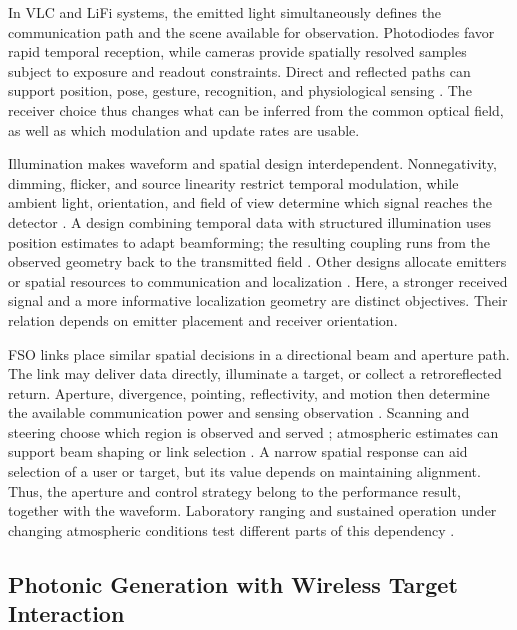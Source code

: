 In VLC and LiFi systems, the emitted light simultaneously defines the
communication path and the scene available for observation. Photodiodes favor
rapid temporal reception, while cameras provide spatially resolved samples
subject to exposure and readout constraints. Direct and reflected paths can
support position, pose, gesture, recognition, and physiological sensing
\cite{OISAC_SCR00910,OISAC_SCR01034,OISAC_SCR01036}. The receiver choice thus
changes what can be inferred from the common optical field, as well as which
modulation and update rates are usable.

Illumination makes waveform and spatial design interdependent. Nonnegativity,
dimming, flicker, and source linearity restrict temporal modulation, while
ambient light, orientation, and field of view determine which signal reaches
the detector \cite{OISAC_SCR00273,OISAC_SCR00925}. A design combining temporal
data with structured illumination uses position estimates to adapt beamforming;
the resulting coupling runs from the observed geometry back to the transmitted
field \cite{OISAC_SCR00196}. Other designs allocate emitters or spatial
resources to communication and localization
\cite{OISAC_SCR00901,OISAC_SCR00407,OISAC_SCR00557}. Here, a stronger received
signal and a more informative localization geometry are distinct objectives.
Their relation depends on emitter placement and receiver orientation.

FSO links place similar spatial decisions in a directional beam and aperture
path. The link may deliver data directly, illuminate a target, or collect a
retroreflected return. Aperture, divergence, pointing, reflectivity, and motion
then determine the available communication power and sensing observation
\cite{OISAC_SCR00011,OISAC_SCR01029,OISAC_SCR00730}. Scanning and steering
choose which region is observed and served
\cite{OISAC_SCR00012,OISAC_SCR00506,OISAC_SCR00941}; atmospheric estimates
can support beam shaping or link selection
\cite{OISAC_SCR01085,OISAC_SCR00456}. A narrow spatial response can aid
selection of a user or target, but its value depends on maintaining alignment.
Thus, the aperture and control strategy belong to the performance result,
together with the waveform. Laboratory ranging and sustained operation under
changing atmospheric conditions test different parts of this dependency
\cite{OISAC_SCR00730,OISAC_SCR01085}.

\subsection{Photonic Generation with Wireless Target Interaction}

